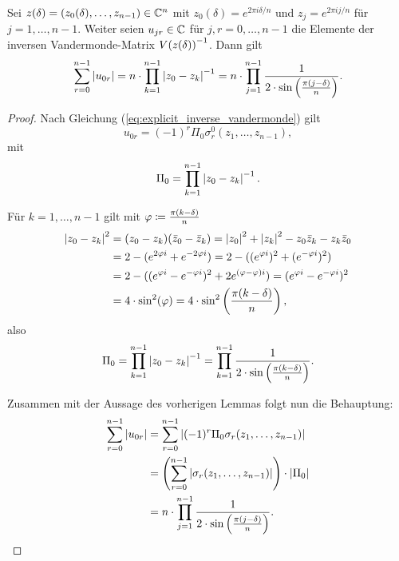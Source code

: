 \begin{lemma}
    \label{lemma:inverse_outlier_vandermonde_first_row_abs_sum}
    Sei $z(\delta) = (z_0(\delta), \dots, z_{n-1}) \in \mathbb{C}^n$ mit
    $z_0(\delta) = e^{2 \pi i \delta / n}$
    und
    $z_j = e^{2 \pi i j / n}$ für $j = 1, \dots, n-1$.
    Weiter seien $u_{jr} \in \mathbb{C}$ für $j,r = 0,\dots,n-1$ die Elemente der
    inversen Vandermonde-Matrix $V \! \left( z(\delta) \right)^{-1}$.
    Dann gilt
    \[
        \sum_{r=0}^{n-1} \left\lvert  u_{0r}  \right\rvert
        = n \cdot \prod_{k=1}^{n-1} \left\lvert z_0 - z_k \right\rvert^{-1}
        = n \cdot \prod_{j=1}^{n-1} \frac{1}{2 \cdot \sin \left(\frac{\pi (j - \delta)}{n} \right)}.
    \]
\end{lemma}

\begin{proof}
    Nach Gleichung (\ref{eq:explicit_inverse_vandermonde}) gilt
    \[
        u_{0r} = (-1)^{r} \Pi_0 \sigma_{r}^{0}(z_1, \dots, z_{n-1}),
    \]
    mit
    \[
        \Pi_0 = \prod_{k=1}^{n-1} \left\lvert  z_0 - z_k  \right\rvert^{-1}.
    \]

    \noindent Für $k = 1,\dots,n-1$ gilt mit $\varphi \coloneqq \frac{\pi (k - \delta)}{n}$
    \[
        \begin{split}
            \left\lvert z_0 - z_k \right\rvert^2
            &= (z_0 - z_k) (\bar{z}_0 - \bar{z}_k)
            = \left\lvert z_0 \right\rvert^2 + \left\lvert z_k \right\rvert^2 - z_0\bar{z}_k - z_k\bar{z}_0\\
            &= 2 - (e^{2 \varphi i} + e^{-2 \varphi i})
            = 2 - ((e^{\varphi i})^2 + (e^{-\varphi i})^2)\\
            &= 2 - ( (e^{\varphi i} - e^{-\varphi i})^2 + 2 e^{(\varphi - \varphi) i})
            = (e^{\varphi i} - e^{-\varphi i})^2\\
            &= 4 \cdot \sin^2 (\varphi)
            = 4 \cdot \sin^2 \left( \frac{\pi (k-\delta)}{n} \right),
        \end{split}
    \]
    also
    \[
        \Pi_0
        = \prod_{\substack{k = 1}}^{n-1} \left\lvert  z_0 - z_k  \right\rvert^{-1}
        = \prod_{\substack{k = 1}}^{n-1} \frac{1}{2 \cdot \sin \left( \frac{\pi (k-\delta)}{n} \right)}.
    \]

    \noindent Zusammen mit der Aussage des vorherigen Lemmas folgt nun die Behauptung:
    \[
        \begin{split}
            \sum_{r=0}^{n-1} \left\lvert  u_{0r}  \right\rvert
            &= \sum_{r=0}^{n-1} \left\lvert  (-1)^{r} \Pi_0 \sigma_{r}(z_1, \dots, z_{n-1})  \right\rvert\\
            &= \left( \sum_{r=0}^{n-1} \left\lvert  \sigma_{r}(z_1, \dots, z_{n-1})  \right\rvert \right) \cdot \left\lvert \Pi_0 \right\rvert\\
            &= n \cdot \prod_{j=1}^{n-1} \frac{1}{2 \cdot \sin \left(\frac{\pi (j - \delta)}{n} \right)}.
        \end{split}
    \]
\end{proof}

